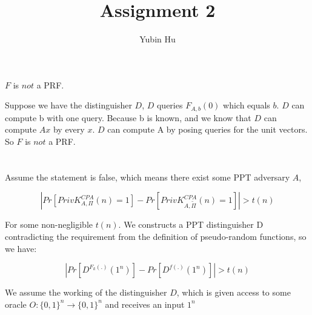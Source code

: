 \documentclass[onecolumn,oneside]{SUSTechHomework}
\author{Yubin Hu}
\title{Assignment 2}
\begin{document}
  \maketitle

  \section{}

  $F$ is $not$ a PRF.

  Suppose we have the distinguisher $D$,
  $D$ queries $F_{A,b}(0)$ which equals $b$. $D$ can compute b with one query.
  Because b is known, and we know that $D$ can compute $Ax$ by every $x$.
  $D$ can compute A by posing queries for the unit vectors.
  So $F$ is $not$ a PRF.

  \section{}

  Assume the statement is false, which means there exist some PPT adversary $A$,

  $$|Pr[PrivK_{A,\Pi}^{CPA}(n)=1]-Pr[PrivK_{A,\widetilde{\Pi}}^{CPA}(n)=1]| > t(n)$$

  For some non-negligible $t(n)$.
  We constructs a PPT distinguisher D contradicting the requirement from the definition of pseudo-random functions, so we have:
  
  $$|Pr[D^{F_k(.)}(1^n)]-Pr[D^{f(.)}(1^n)]|>t(n)$$

  We assume the working of the distinguisher $D$, which is given access to some oracle $O:\{0,1\}^n \rightarrow \{0,1\}^n$ and receives an input $1^n$
\end{document}
